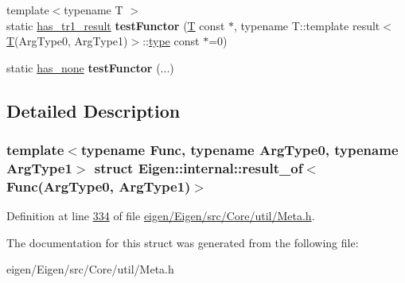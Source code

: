\begin{DoxyCompactItemize}
\item 
\mbox{\label{struct_eigen_1_1internal_1_1result__of_3_01_func_07_arg_type0_00_01_arg_type1_08_4_aa1cb85adf69c0fcd326bdc7080ab0d81}} 
{\footnotesize template$<$typename T $>$ }\\static \hyperlink{struct_eigen_1_1internal_1_1has__tr1__result}{has\+\_\+tr1\+\_\+result} {\bfseries test\+Functor} (\hyperlink{group___sparse_core___module}{T} const $\ast$, typename T\+::template result$<$ \hyperlink{group___sparse_core___module}{T}(Arg\+Type0, Arg\+Type1)$>$\+::\hyperlink{group___sparse_core___module}{type} const $\ast$=0)
\item 
\mbox{\label{struct_eigen_1_1internal_1_1result__of_3_01_func_07_arg_type0_00_01_arg_type1_08_4_a583c311eaa5282bc065a1e379d2b8031}} 
static \hyperlink{struct_eigen_1_1internal_1_1has__none}{has\+\_\+none} {\bfseries test\+Functor} (...)
\end{DoxyCompactItemize}


\subsection{Detailed Description}
\subsubsection*{template$<$typename Func, typename Arg\+Type0, typename Arg\+Type1$>$\newline
struct Eigen\+::internal\+::result\+\_\+of$<$ Func(\+Arg\+Type0, Arg\+Type1)$>$}



Definition at line \hyperlink{eigen_2_eigen_2src_2_core_2util_2_meta_8h_source_l00334}{334} of file \hyperlink{eigen_2_eigen_2src_2_core_2util_2_meta_8h_source}{eigen/\+Eigen/src/\+Core/util/\+Meta.\+h}.



The documentation for this struct was generated from the following file\+:\begin{DoxyCompactItemize}
\item 
eigen/\+Eigen/src/\+Core/util/\+Meta.\+h\end{DoxyCompactItemize}
